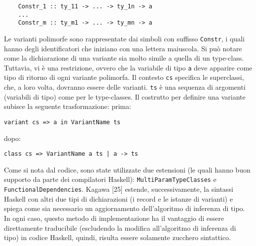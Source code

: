 \documentclass[10pt,a4paper]{article}
\begin{document}
\begin{itemize}
\begin{lstlisting}
    Constr_1 :: ty_11 -> ... -> ty_1n -> a
    ...
    Constr_m :: ty_m1 -> ... -> ty_mn -> a
\end{lstlisting}
    Le varianti polimorfe sono rappresentate dai simboli con suffisso \texttt{Constr}, i quali hanno degli identificatori
    che iniziano con una lettera maiuscola. Si può notare come la dichiarazione di una variante sia molto simile a quella
    di un type-class. Tuttavia, vi è una restrizione, ovvero che la variabile di tipo \texttt{a} deve apparire come tipo
    di ritorno di ogni variante polimorfa. Il contesto \texttt{cs} specifica le superclassi, che, a loro volta, dovranno
    essere delle varianti. \texttt{ts} è una sequenza di argomenti (variabili di tipo) come per le type-classes.
    Il costrutto per definire una variante subisce la seguente trasformazione:
    \newline
    prima:
\begin{lstlisting}
variant cs => a in VariantName ts
\end{lstlisting}
    dopo:
\begin{lstlisting}
class cs => VariantName a ts | a -> ts
\end{lstlisting}
    Come si nota dal codice, sono state utilizzate due estensioni (le quali hanno buon supporto da parte dei compilatori
    Haskell): \texttt{MultiParamTypeClasses} e \texttt{FunctionalDependencies}.
    Kagawa [25] estende, successivamente, la sintassi Haskell con altri due tipi di
    dichiarazioni (i record e le istanze di varianti) e spiega come sia necessario un aggiornamento dell'algoritmo di
    inferenza di tipo. In ogni caso, questo metodo di implementazione ha il vantaggio di essere direttamente traducibile
    (escludendo la modifica all'algoritmo di inferenza di tipo) in codice Haskell, quindi, risulta essere solamente
    zucchero sintattico.
\end{itemize}
\end{document}
